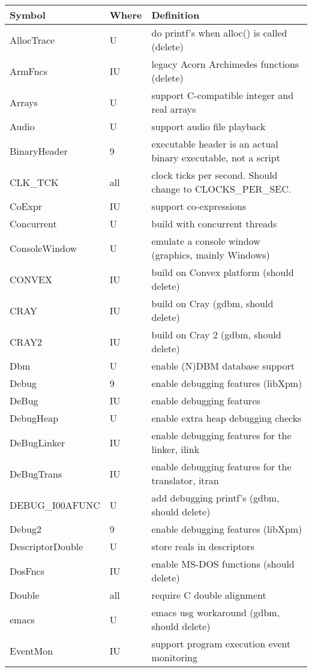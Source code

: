 \begin{xtabular}{|m{1.8in}|m{0.5in}|m{4.0in}|}
\hline
Symbol & Where & Definition \\ \hline
AllocTrace & U & do printf's when alloc() is called (delete) \\
ArmFncs & IU & legacy Acorn Archimedes functions (delete) \\
Arrays & U & support C-compatible integer and real arrays \\
Audio & U & support audio file playback \\
BinaryHeader & 9 & executable header is an actual binary executable,
		not a script \\
CLK\_TCK & all & clock ticks per second. Should change to CLOCKS\_PER\_SEC. \\
CoExpr & IU & support co-expressions \\
Concurrent & U & build with concurrent threads \\
ConsoleWindow & U & emulate a console window (graphics, mainly Windows) \\
CONVEX & IU & build on Convex platform (should delete) \\
CRAY & IU & build on Cray (gdbm, should delete) \\
CRAY2 & IU & build on Cray 2 (gdbm, should delete) \\
Dbm & U & enable (N)DBM database support \\
Debug & 9 & enable debugging features (libXpm) \\
DeBug & IU & enable debugging features \\
DebugHeap & U & enable extra heap debugging checks \\
DeBugLinker & IU & enable debugging features for the linker, ilink \\
DeBugTrans & IU & enable debugging features for the translator, itran \\
DEBUG\_I00AFUNC & U & add debugging printf's (gdbm, should delete) \\
Debug2 & 9 & enable debugging features (libXpm) \\
DescriptorDouble & U & store reals in descriptors \\
DosFncs & IU & enable MS-DOS functions (should delete) \\
Double & all & require C double alignment \\
emacs & U & emacs usg workaround (gdbm, should delete) \\
EventMon & IU & support program execution event monitoring \\

\end{xtabular}
